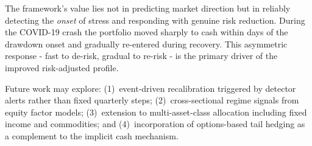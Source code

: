 \documentclass[11pt]{article}
\begin{document}
The framework's value lies not in predicting market direction but in
reliably detecting the \emph{onset} of stress and responding with
genuine risk reduction. During the COVID-19 crash the portfolio moved
sharply to cash within days of the drawdown onset and gradually
re-entered during recovery. This asymmetric response - fast to de-risk,
gradual to re-risk - is the primary driver of the improved risk-adjusted
profile.

Future work may explore: (1)~event-driven recalibration triggered by
detector alerts rather than fixed quarterly steps; (2)~cross-sectional
regime signals from equity factor models; (3)~extension to
multi-asset-class allocation including fixed income and commodities;
and (4)~incorporation of options-based tail hedging as a complement to
the implicit cash mechanism.


\end{document}
